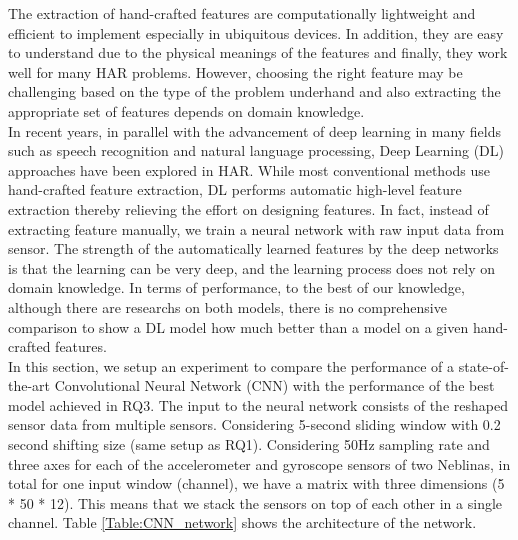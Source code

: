 \documentclass[journal,article,submit,moreauthors,pdftex]{Definitions/mdpi}
\begin{document}
The extraction of hand-crafted features are computationally lightweight and efficient to implement especially in ubiquitous devices. In addition, they are easy to understand due to the physical meanings of the features and finally, they work well for many HAR problems. However, choosing the right feature may be challenging based on the type of the problem underhand and also extracting the appropriate set of features depends on domain knowledge. \\
In recent years, in parallel with the advancement of deep learning in many fields such as speech recognition and natural language processing, Deep Learning (DL) approaches have been explored in HAR. While most conventional methods use hand-crafted feature extraction, DL performs automatic high-level feature extraction thereby relieving the effort on designing features. In fact, instead of extracting feature manually, we train a neural network with raw input data from sensor. The strength of the automatically learned features by the deep networks is that the learning can be very deep, and the learning process does not rely on domain knowledge. In terms of performance, to the best of our knowledge, although there are researchs on both models, there is no comprehensive comparison to show a DL model how much better than a model on  a given hand-crafted features.\\
In this section, we setup an experiment to compare the performance of a state-of-the-art Convolutional Neural Network (CNN) with the performance of the best model achieved in RQ3. 
The input to the neural network consists of the reshaped sensor data from multiple sensors. Considering 5-second sliding window with 0.2 second shifting size (same setup as RQ1). Considering 50Hz sampling rate and three axes for each of the accelerometer and gyroscope sensors of two Neblinas, in total for one input window (channel), we have a matrix with three dimensions (5 * 50 * 12). This means that we stack the sensors on top of each other in a single channel. Table \ref{Table:CNN_network} shows the architecture of the network.
\end{document}
